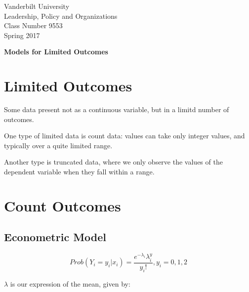 \documentclass[12 pt]{article}
\begin{document}
\newcommand{\boldbeta}{\boldsymbol{\beta}}
\newcommand{\boldy}{\boldsymbol{y}}
\newcommand{\boldX}{\boldsymbol{X}}
\newcommand{\boldx}{\boldsymbol{x}}
\newcommand{\boldz}{\boldsymbol{z}}
\newcommand{\boldgamma}{\boldsymbol{\gamma}}
\newcommand{\boldeps}{\boldsymbol{\epsilon}}


\setlength{\parskip}{1ex plus 0.5ex minus 0.2ex}

\setcounter{secnumdepth}{-2}


\begin{flushleft}
  

Vanderbilt University \\
Leadership, Policy and Organizations \\
Class Number 9553 \\
Spring 2017 \\
\end{flushleft}

\begin{centering}
\textbf{\large{Models for Limited Outcomes}}  
\end{centering}


\section{Limited Outcomes}

Some data present not as a continuous variable, but in a limitd number of outcomes.

One type of limited data is count data: values can take only integer values, and typically over a quite limited range. 

Another type is truncated data, where we only observe the values of the dependent variable when they fall within a range. 

\section{Count Outcomes}

\subsection{Econometric Model}

\begin{equation}
  \label{eq:1}
  Prob(Y_i=y_i|x_i)=\frac{e^{-\lambda_i}\lambda^y_i}{y_i!}, y_i=0,1,2
\end{equation}

$\lambda$ is our expression of the mean, given by:
\end{document}
